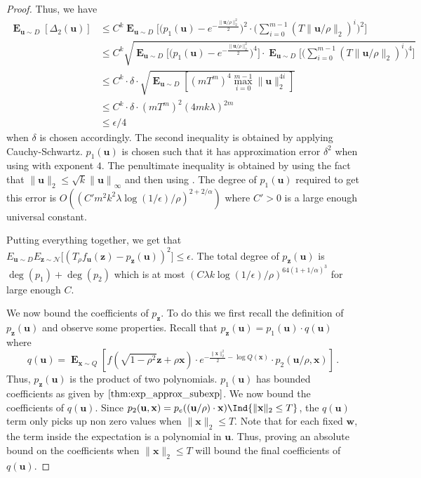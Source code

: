 \documentclass{theoretics}
\newcommand\twonorm[1]{\|#1\|_2}
\newcommand\norm[1]{\left\| #1 \right\|}
\renewcommand\vec[1]{\mathbf{#1}}
\DeclareMathOperator*{\E}{\mathbf{E}}
\newcommand{\1}{\Ind}
\newcommand{\x}{\vec x}
\newcommand{\vu}{\vec u}
\newcommand{\vw}{\vec w}
\newcommand{\z}{\vec z}
\newcommand{\Gauss}{\mathcal{N}}
\begin{document}
\begin{proof}
Thus, we have 
\begin{align*}
    \E_{\vu\sim D}\left[\Delta_2(\vu)\right]&\leq C^{k}\E_{\vu\sim D}\biggl[\bigl(p_1(\vu)-e^{-\frac{\twonorm{\vu/\rho}^2}{2}}\bigr)^2\cdot\biggl(\sum_{i=0}^{m-1}(T\twonorm{\vu/\rho})^i\biggr)^2\biggr]\\
   & \leq C^k\sqrt{\E_{\vu\sim D}\biggl[\biggl(p_1(\vu)-e^{-\frac{\twonorm{\vu/\rho}^2}{2}}\biggr)^4\biggr]\cdot\E_{\vu\sim D}\biggl[\biggl({\sum_{i=0}^{m-1}(T\twonorm{\vu/\rho})^i}\biggr)^{4}\biggr]}\\
   &\leq C^k\cdot \delta \cdot \sqrt{\E_{\vu\sim D}\left[(mT^{m})^{4}\max_{i=0}^{m-1}\twonorm{\vu}^{4i}\right]}\\
    & \leq C^k\cdot \delta\cdot (mT^m)^2(4mk\lambda)^{2m}  \\
    &\leq \epsilon/4
 \end{align*}
when $\delta$ is chosen accordingly. The second inequality is obtained by applying Cauchy-Schwartz.  $p_1(\vu)$ is chosen such that it has approximation error $\delta^2$ when using  with exponent $4$. The penultimate inequality is obtained by using the fact that $\twonorm{\vu}\leq \sqrt{k}\norm{\vu}_{\infty}$ and then using . The degree of $p_1(\vu)$ required to get this error is $O\left((C'm^2k^2\lambda\log(1/\epsilon)/\rho)^{2+2/\alpha}\right)$ where $C'>0$ is a large enough universal constant.


Putting everything together, we get that $E_{\vu\sim D}E_{\z\sim \Gauss}\bigl[(T_{\rho}f_{\vu}(\z)-p_{\z}(\vu))^2\bigr]\leq \epsilon$. The total degree of $p_{\z}(\vu)$ is $\deg(p_1)+\deg(p_2)$ which is at most $\left(C\lambda k\log (1/\epsilon)/\rho\right)^{64(1+1/\alpha)^3} $ for large enough $C$.

We now bound the coefficients of $p_{\z}$. To do this we first recall the definition of $p_{\z}(\vu)$ and observe some properties. Recall that $p_{\z}(\vu)=p_1(\vu)\cdot q(\vu)$ where \[q(\vu)=\E_{\x\sim Q}\left[f(\sqrt{1-\rho^2}\z+\rho\x)\cdot e^{-\frac{\twonorm{\x}^2}{2}-\log Q(\x)}\cdot p_2(\vu/\rho,\x)\right]\,.\] Thus, $p_{\z}(\vu)$ is the product of two polynomials. $p_1(\vu)$ has bounded coefficients as given by $\Cref{thm:exp_approx_subexp}$. We now bound the coefficients of $q(\vu)$. Since $p_2(\vu,\x)=p_e((\vu/\rho)\cdot \x)\1\{\twonorm{\x}\leq T\}$, the $q(\vu)$ term only picks up non zero values when $\twonorm{\x}\leq T$. Note that for each fixed $\vw$, the term inside the expectation is a polynomial in $\vu$. Thus, proving an absolute bound on the coefficients when $\twonorm{\x}\leq T$ will bound the final coefficients of $q(\vu)$. 


\end{proof}
\end{document}
